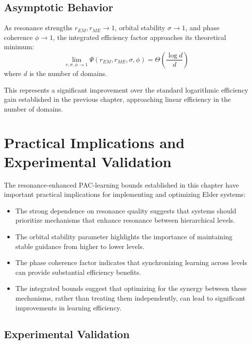 \subsection{Asymptotic Behavior}

\begin{corollary}
As resonance strengths $r_{EM}, r_{ME} \to 1$, orbital stability $\sigma \to 1$, and phase coherence $\phi \to 1$, the integrated efficiency factor approaches its theoretical minimum:
\begin{equation}
\lim_{r, \sigma, \phi \to 1} \Psi(r_{EM}, r_{ME}, \sigma, \phi) = \Theta\left(\frac{\log d}{d}\right)
\end{equation}
where $d$ is the number of domains.
\end{corollary}

This represents a significant improvement over the standard logarithmic efficiency gain established in the previous chapter, approaching linear efficiency in the number of domains.

\section{Practical Implications and Experimental Validation}

The resonance-enhanced PAC-learning bounds established in this chapter have important practical implications for implementing and optimizing Elder systems:

\begin{itemize}
    \item The strong dependence on resonance quality suggests that systems should prioritize mechanisms that enhance resonance between hierarchical levels.
    
    \item The orbital stability parameter highlights the importance of maintaining stable guidance from higher to lower levels.
    
    \item The phase coherence factor indicates that synchronizing learning across levels can provide substantial efficiency benefits.
    
    \item The integrated bounds suggest that optimizing for the synergy between these mechanisms, rather than treating them independently, can lead to significant improvements in learning efficiency.
\end{itemize}

\subsection{Experimental Validation}

